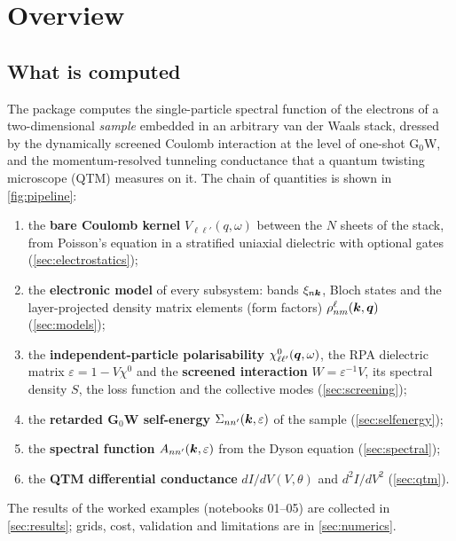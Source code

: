 \section{Overview}
\label{sec:overview}

\subsection{What is computed}

The package computes the single-particle spectral function of the electrons of a two-dimensional
\emph{sample} embedded in an arbitrary van der Waals stack, dressed by the dynamically screened Coulomb
interaction at the level of one-shot G$_0$W, and the momentum-resolved tunneling conductance that a
quantum twisting microscope (QTM) measures on it. The chain of quantities is shown in \cref{fig:pipeline}:
\begin{enumerate}
\item the \textbf{bare Coulomb kernel} $V_{\ell\ell'}(q,\omega)$ between the $N$ sheets of the stack, from
      Poisson's equation in a stratified uniaxial dielectric with optional gates (\cref{sec:electrostatics});
\item the \textbf{electronic model} of every subsystem: bands $\xi_{n\bm k}$, Bloch states and the
      layer-projected density matrix elements (form factors) $\rho^\ell_{nm}(\bm k,\bm q)$ (\cref{sec:models});
\item the \textbf{independent-particle polarisability} $\chi^0_{\ell\ell'}(\bm q,\omega)$, the RPA dielectric
      matrix $\varepsilon=1-V\chi^0$ and the \textbf{screened interaction} $W=\varepsilon^{-1}V$, its spectral
      density $S$, the loss function and the collective modes (\cref{sec:screening});
\item the \textbf{retarded G$_0$W self-energy} $\Sigma_{nn'}(\bm k,\varepsilon)$ of the sample (\cref{sec:selfenergy});
\item the \textbf{spectral function} $A_{nn'}(\bm k,\varepsilon)$ from the Dyson equation (\cref{sec:spectral});
\item the \textbf{QTM differential conductance} $dI/dV(V,\theta)$ and $d^2I/dV^2$ (\cref{sec:qtm}).
\end{enumerate}
The results of the worked examples (notebooks 01--05) are collected in \cref{sec:results}; grids, cost, validation
and limitations are in \cref{sec:numerics}.

